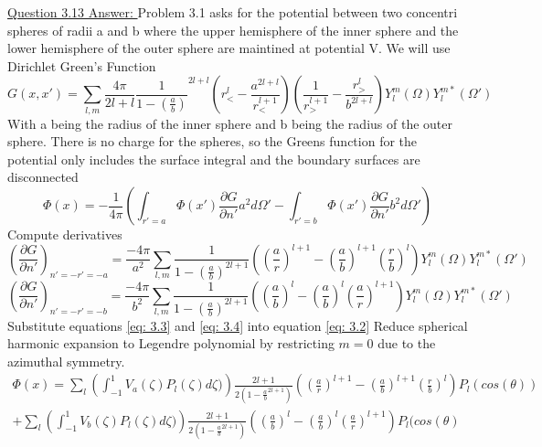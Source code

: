 \documentclass[12pt]{article}
\begin{document}
    \underline{Question 3.13 Answer: }
    \newline Problem 3.1 asks for the potential between two concentri spheres of radii a and b where the upper hemisphere of the inner sphere and the lower hemisphere of the outer sphere are maintined at potential V.
    We will use Dirichlet Green's Function
    \begin{equation} \label{eq: 3.1}
        G(x,x') = \sum_{l,m} \frac{4 \pi}{2 l + l} \frac{1}{1-\left(\frac{a}{b} \right)}^{2l + l} \left(r_<^l - \frac{a^{2l + l}}{r_<^{l + 1}} \right) \left(\frac{1}{r_>^{l + 1}} - \frac{r_>^l}{b^{2l + l}} \right) Y_l^m(\Omega) Y_l^{m*}(\Omega')
    \end{equation}
    With a being the radius of the inner sphere and b being the radius of the outer sphere. There is no charge for the spheres, so the Greens function for the potential only includes the surface integral and the boundary surfaces are disconnected
    \begin{equation} \label{eq: 3.2}
        \Phi(x) = -\frac{1}{4 \pi} \left( \int_{r'=a} \Phi(x') \frac{\partial G}{\partial n'} a^2 d\Omega' - \int_{r'=b} \Phi(x') \frac{\partial G}{\partial n'} b^2 d\Omega' \right)
    \end{equation}
    Compute derivatives
    \begin{equation} \label{eq: 3.3}
        \left(\frac{\partial G}{\partial n'} \right)_{n'=-r'=-a} = \frac{- 4 \pi}{a^2} \sum_{l,m} \frac{1}{1-\left(\frac{a}{b} \right)^{2l+1}} \left(\left(\frac{a}{r} \right)^{l+1} - \left(\frac{a}{b} \right)^{l+1} \left(\frac{r}{b} \right)^l \right) Y_l^m(\Omega) Y_l^{m*}(\Omega')
    \end{equation}
    \begin{equation} \label{eq: 3.4}
        \left(\frac{\partial G}{\partial n'} \right)_{n'=-r'=-b} = \frac{- 4 \pi}{b^2} \sum_{l,m} \frac{1}{1-\left(\frac{a}{b} \right)^{2l+1}} \left(\left(\frac{a}{b} \right)^l - \left(\frac{a}{b} \right)^l \left(\frac{a}{r} \right)^{l+1} \right) Y_l^m(\Omega) Y_l^{m*}(\Omega')
    \end{equation}
    Substitute equations \ref{eq: 3.3} and \ref{eq: 3.4} into equation \ref{eq: 3.2}
    \newline Reduce spherical harmonic expansion to Legendre polynomial by restricting $m=0$ due to the azimuthal symmetry. 
    \begin{equation} \label{eq: 3.5}
        \begin{split}
        \Phi(x) = \sum_l \left(\int_{-1}^1 V_a(\zeta) P_l(\zeta) d\zeta) \right) \frac{2l + 1}{2 \left(1 - \frac{a}{b}^{2l+1} \right)} \left(\left(\frac{a}{r} \right)^{l+1} - \left(\frac{a}{b} \right)^{l+1} \left(\frac{r}{b} \right)^l \right) P_l(cos(\theta)) 
        \\ + \sum_l \left(\int_{-1}^1 V_b(\zeta) P_l(\zeta) d\zeta) \right) \frac{2l + 1}{2 \left(1 - \frac{a}{b}^{2l+1} \right)} \left(\left(\frac{a}{b} \right)^l - \left(\frac{a}{b} \right)^l \left(\frac{a}{r} \right)^{l+1} \right) P_l(cos(\theta)
        \end{split}
    \end{equation}
\end{document}
